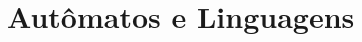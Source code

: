 \documentclass[b5paper,10pt]{book}
\begin{document}
	\part{Autômatos e Linguagens}
	

\end{document}
